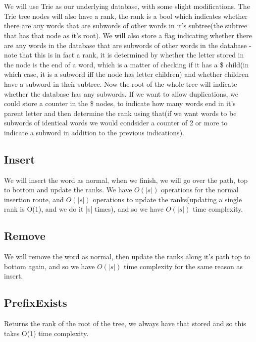 \documentclass{article}
\begin{document}
\section{}
We will use Trie as our underlying database, with some slight modifications. The Trie tree nodes will also have a rank, the rank is a bool
which indicates whether there are any words that are subwords of other words
in it's subtree(the subtree that has that node as it's root).
We will also store a flag indicating whether there are any words in the 
database that are subwords of other words in the database - note that
this is in fact a rank, it is determined by whether the letter stored
in the node is the end of a word, which is a matter of checking if it has a \$ child(in which case, it is a subword iff the node has letter children) and whether children have a subword in their subtree.
Now the root of the whole tree will indicate whether the database has any subwords.
If we want to allow duplications, we could store a counter in the \$ nodes, to indicate how many words end in it's parent letter and then determine the rank using that(if we want words to be subwords of identical words we would condsider a counter of 2 or more to indicate a subword in addition to the previous indications). 
\subsection*{Insert}
We will insert the word as normal, when we finish, we will go over the path, top to bottom and update the ranks. We have $O(|s|)$ operations for the normal insertion route, and $O(|s|)$ operations to update the ranks(updating a single rank is O(1), and we do it |s| times), and so we have $O(|s|)$ time complexity.
\subsection*{Remove}
We will remove the word as normal, then update the ranks along it's path top to bottom again, and so we have $O(|s|)$ time complexity for the same reason as insert.
\subsection*{PrefixExists}
Returns the rank of the root of the tree, we always have that stored and so this takes O(1) time complexity.
\end{document}
